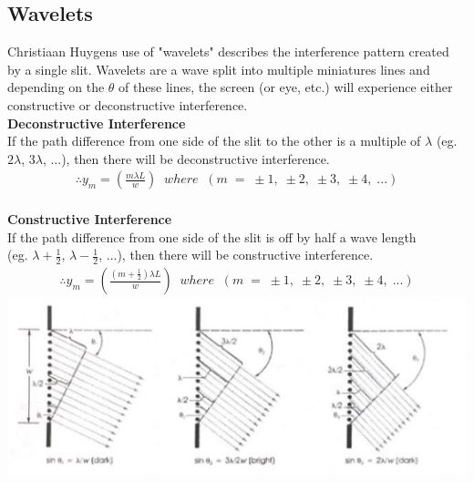 \documentclass{article}
\begin{document}
\subsection{Wavelets}
Christiaan Huygens use of "wavelets" describes the interference pattern created by a single slit. Wavelets are a wave split into multiple miniatures lines and depending on the $\theta$ of these lines, the screen (or eye, etc.) will experience either constructive or deconstructive interference.\\

\noindent\textbf{Deconstructive Interference}\\
If the path difference from one side of the slit to the other is a multiple of $\lambda$ (eg. $2\lambda$, $3\lambda$, ...), then there will be deconstructive interference.
\begin{align*}
    \therefore y_m = \left(\frac{m\lambda L}{w}\right)\;\; where\;\;(m\;=\;\pm 1,\;\pm 2,\;\pm 3,\;\pm 4,\;...)
\end{align*}\leavevmode\\

\noindent\textbf{Constructive Interference}\\
If the path difference from one side of the slit is off by half a wave length\\(eg. $\lambda + \frac{1}{2}$, $\lambda - \frac{1}{2}$, ...), then there will be constructive interference.
\begin{align*}
    \therefore y_m = \left(\frac{(m + \frac{1}{2})\lambda L}{w}\right)\;\; where\;\;(m\;=\;\pm 1,\;\pm 2,\;\pm 3,\;\pm 4,\;...)
\end{align*}\leavevmode
\includegraphics[scale=0.8]{images/wavelets} \\
\end{document}
